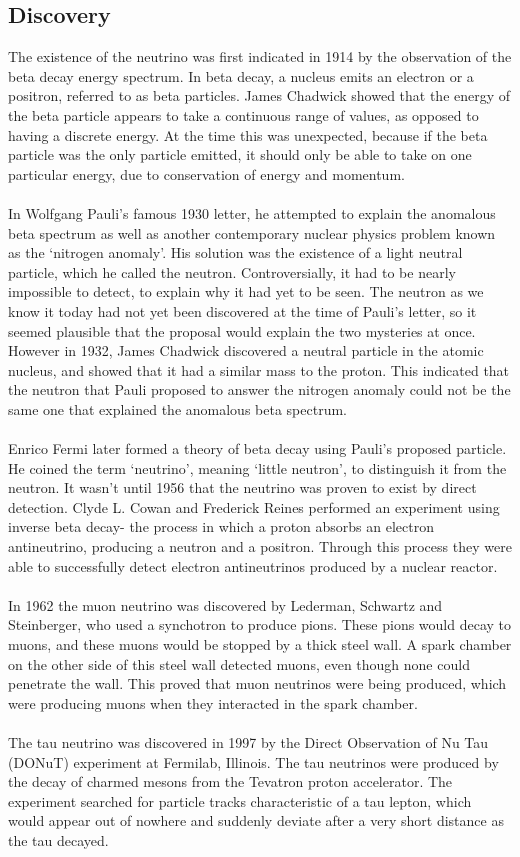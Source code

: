 \documentclass[12pt]{article}
\begin{document}
\subsection{Discovery}
The existence of the neutrino was first indicated in 1914 by the observation of the beta decay energy spectrum. In beta decay, a nucleus emits an electron or a positron, referred to as beta particles. James Chadwick showed that the energy of the beta particle appears to take a continuous range of values, as opposed to having a discrete energy\cite{Close}. At the time this was unexpected, because if the beta particle was the only particle emitted, it should only be able to take on one particular energy, due to conservation of energy and momentum.\\\\
In Wolfgang Pauli's famous 1930 letter\cite{Close}, he attempted to explain the anomalous beta spectrum as well as another contemporary nuclear physics problem known as the `nitrogen anomaly'. His solution was the existence of a light neutral particle, which he called the neutron. Controversially, it had to be nearly impossible to detect, to explain why it had yet to be seen. The neutron as we know it today had not yet been discovered at the time of Pauli's letter, so it seemed plausible that the proposal would explain the two mysteries at once. However in 1932, James Chadwick discovered a neutral particle in the atomic nucleus, and showed that it had a similar mass to the proton\cite{Close}. This indicated that the neutron that Pauli proposed to answer the nitrogen anomaly could not be the same one that explained the anomalous beta spectrum.\\\\
Enrico Fermi later formed a theory of beta decay using Pauli's proposed particle. He coined the term `neutrino', meaning `little neutron', to distinguish it from the neutron\cite{Close}. It wasn't until 1956 that the neutrino was proven to exist by direct detection. Clyde L. Cowan and Frederick Reines performed an experiment using inverse beta decay- the process in which a proton absorbs an electron antineutrino, producing a neutron and a positron. Through this process they were able to successfully detect electron antineutrinos produced by a nuclear reactor\cite{Cowan}.\\\\
In 1962 the muon neutrino was discovered by Lederman, Schwartz and Steinberger\cite{Lederman}, who used a synchotron to produce pions. These pions would decay to muons, and these muons would be stopped by a thick steel wall. A spark chamber on the other side of this steel wall detected muons, even though none could penetrate the wall. This proved that muon neutrinos were being produced, which were producing muons when they interacted in the spark chamber.\\\\
The tau neutrino was discovered in 1997 by the Direct Observation of Nu Tau (DONuT) experiment at Fermilab, Illinois\cite{tau}. The tau neutrinos were produced by the decay of charmed mesons from the Tevatron proton accelerator. The experiment searched for particle tracks characteristic of a tau lepton, which would appear out of nowhere and suddenly deviate after a very short distance as the tau decayed.
\end{document}
